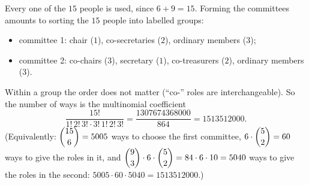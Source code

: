 Every one of the $15$ people is used, since $6+9=15$. Forming the committees amounts to sorting the $15$ people into labelled groups:
\begin{itemize}
\item committee 1: chair ($1$), co-secretaries ($2$), ordinary members ($3$);
\item committee 2: co-chairs ($3$), secretary ($1$), co-treasurers ($2$), ordinary members ($3$).
\end{itemize}
Within a group the order does not matter (``co-'' roles are interchangeable). So the number of ways is the multinomial coefficient
\[
\dfrac{15!}{1!\,2!\,3!\cdot3!\,1!\,2!\,3!}=\dfrac{1307674368000}{864}=\boxed{1513512000}.
\]
(Equivalently: $\dbinom{15}{6}=5005$ ways to choose the first committee, $6\cdot\dbinom52=60$ ways to give the roles in it, and $\dbinom93\cdot6\cdot\dbinom52=84\cdot6\cdot10=5040$ ways to give the roles in the second: $5005\cdot60\cdot5040=1513512000$.)
